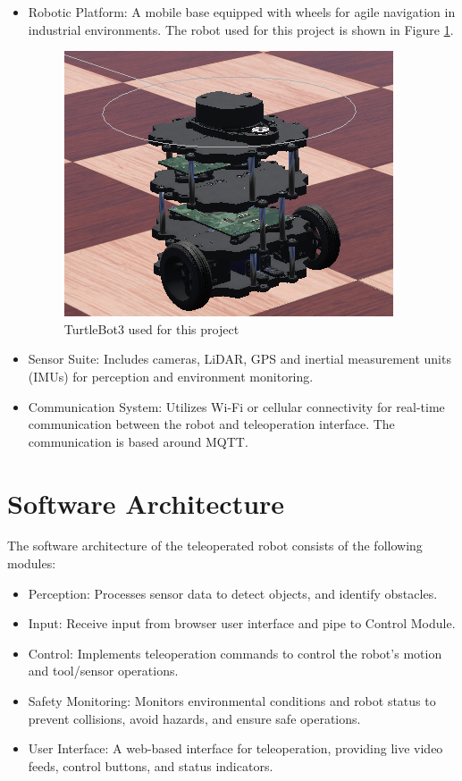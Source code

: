 \documentclass{article}
\begin{document}
\begin{itemize}
    \item Robotic Platform: A mobile base equipped with wheels for agile navigation in industrial environments. The robot used for this project is shown in Figure \ref{fig:turtlebot}.

        \begin{figure}[h]
        \centering
        \includegraphics[width=0.5\linewidth]{Design Document/TurtleBot3.png}
        \caption{TurtleBot3 used for this project}
        \label{fig:turtlebot}
    \end{figure}
    
    \item Sensor Suite: Includes cameras, LiDAR, GPS and inertial measurement units (IMUs) for perception and environment monitoring.
    
    \item Communication System: Utilizes Wi-Fi or cellular connectivity for real-time communication between the robot and teleoperation interface. The communication is based around MQTT.
\end{itemize}

\section{Software Architecture}

The software architecture of the teleoperated robot consists of the following modules:

\begin{itemize}
    \item Perception: Processes sensor data to detect objects, and identify obstacles.
    \item Input: Receive input from browser user interface and pipe to Control Module.
    \item Control: Implements teleoperation commands to control the robot's motion and tool/sensor operations.
    \item Safety Monitoring: Monitors environmental conditions and robot status to prevent collisions, avoid hazards, and ensure safe operations.
    \item User Interface: A web-based interface for teleoperation, providing live video feeds, control buttons, and status indicators.
\end{itemize}
\end{document}

